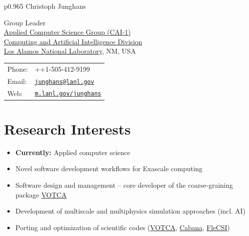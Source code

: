\documentclass{article}
\begin{document}
\thispagestyle{plain}
\vspace*{-1.2cm}

\begin{tabular}{p{0.965\textwidth}}
{\huge Christoph Junghans}\\
\hline
\end{tabular}
\vspace{0.2in}

\begin{minipage}{0.55\linewidth}
  Group Leader\\ 
  \href{https://m.lanl.gov/cai-1}{Applied Computer Science Group (CAI-1)}\\
  \href{https://m.lanl.gov/cai}{Computing and Artificial Intelligence Division}\\
  \href{http://www.lanl.gov}{Los Alamos National Laboratory}, NM, USA
\end{minipage}
\begin{minipage}{0.45\linewidth}
  \begin{tabular}{ll}
    Phone: & ++1-505-412-9199 \\
    Email: & \href{mailto:junghans@lanl.gov}{\tt junghans@lanl.gov} \\
    Web: & \href{http://m.lanl.gov/junghans}{\tt m.lanl.gov/junghans} \\
  \end{tabular}
\end{minipage}

\section*{Research Interests}
\begin{itemize}
\setlength{\itemsep}{0pt}
\setlength{\parskip}{0pt}
\setlength{\parsep}{0pt}
\item \textbf{Currently:} Applied computer science
\item Novel software development workflows for Exascale computing
\item Software design and management -- core developer of the coarse-graining package \href{http://www.votca.org}{VOTCA}
\item Development of multiscale and multiphysics simulation approaches (incl. AI)
\item Porting and optimization of scientific codes (\href{http://www.votca.org}{VOTCA}, \href{https://github.com/ECP-copa/Cabana}{Cabana}, \href{http://www.flecsi.org}{FleCSI})
\end{itemize}
\end{document}
